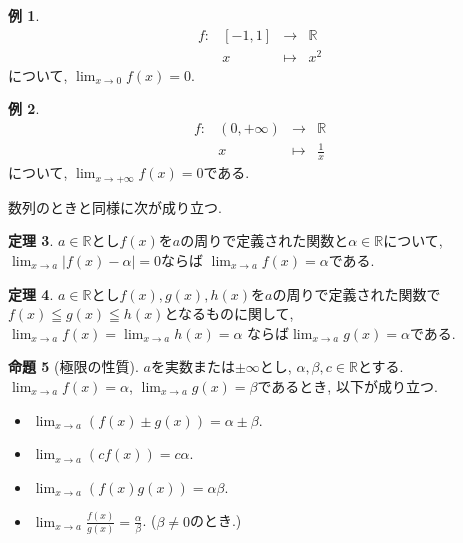 \documentclass[dvipdfmx,a4paper,11pt]{article}
\newcommand{\R}{\mathbb{R}}
\theoremstyle{definition}
\newtheorem{thm}{定理}
\newtheorem{prop}[thm]{命題}
\newtheorem{exa}[thm]{例}
\begin{document}
  

  
  \begin{exa}
     $$
\begin{array}{cccc}
f: &[-1,1]& \rightarrow & \R  \\
&x& \longmapsto & x^2
\end{array}
$$
について, $\lim_{x \rightarrow 0} f(x) =0.$
\end{exa}

  \begin{exa}
     $$
\begin{array}{cccc}
f: &(0 , +\infty)& \rightarrow & \R  \\
&x& \longmapsto & \frac{1}{x}
\end{array}
$$
について, $\lim_{x \rightarrow +\infty} f(x) =0$である.
\end{exa}

数列のときと同様に次が成り立つ. 
  \begin{tcolorbox}[
    colback = white,
    colframe = green!35!black,
    fonttitle = \bfseries,
    breakable = true]
    \begin{thm}
$a\in \R$とし$f(x)$を$a$の周りで定義された関数と$\alpha \in \R$について, 
$\lim_{x \rightarrow a } | f(x) - \alpha |  = 0$ならば
$\lim_{x \rightarrow a } f(x) =\alpha$である.
 \end{thm}
 \end{tcolorbox}

  \begin{tcolorbox}[
    colback = white,
    colframe = green!35!black,
    fonttitle = \bfseries,
    breakable = true]
    \begin{thm}
   $a\in \R$とし$f(x), g(x), h(x)$を$a$の周りで定義された関数で$f(x) \leqq g(x) \leqq h(x)$となるものに関して, $\lim_{x \rightarrow a}f(x)= \lim_{x \rightarrow a }h(x) =\alpha$
ならば$\lim_{x \rightarrow a} g(x) =\alpha$である.

 \end{thm}
 \end{tcolorbox}
 

 \begin{tcolorbox}[
    colback = white,
    colframe = green!35!black,
    fonttitle = \bfseries,
    breakable = true]
    \begin{prop}[極限の性質]
     $a$を実数または$\pm \infty$とし, $\alpha, \beta, c \in \R$とする. 
  $\lim_{x \rightarrow a} f(x) = \alpha$, 
    $\lim_{x \rightarrow a} g(x)= \beta$であるとき, 以下が成り立つ.
 \begin{itemize}
   \setlength{\parskip}{0cm} 
  \setlength{\itemsep}{0cm}
 \item $\lim_{x \rightarrow a}  (f(x) \pm g(x)) = \alpha \pm \beta$.
  \item $\lim_{x \rightarrow a} (c f(x)) = c\alpha $.
   \item $\lim_{x \rightarrow a}  (f(x)g(x)) = \alpha  \beta$.
    \item $\lim_{x \rightarrow a} \frac{f(x)}{g(x)} = \frac{\alpha}{\beta}$.
    ($\beta \neq 0$のとき.)
 \end{itemize}
 \end{prop}
   \end{tcolorbox}
   
\end{document}
